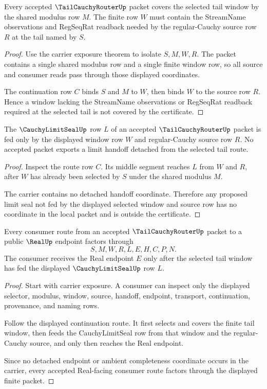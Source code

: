 \begin{theorem}
\label{thm:tailcauchyrouter-modulus-window-coverage}
Every accepted $\TailCauchyRouterUp$ packet covers the selected tail window by the shared modulus row $M$. The finite row $W$ must contain the StreamName observations and RegSeqRat readback needed by the regular-Cauchy source row $R$ at the tail named by $S$.
\end{theorem}
\begin{proof}
Use the carrier exposure theorem to isolate $S,M,W,R$. The packet contains a single shared modulus row and a single finite window row, so all source and consumer reads pass through those displayed coordinates.

The continuation row $C$ binds $S$ and $M$ to $W$, then binds $W$ to the source row $R$. Hence a window lacking the StreamName observations or RegSeqRat readback required at the selected tail is not covered by the certificate.
\end{proof}

\begin{theorem}
\label{thm:tailcauchyrouter-seal-non-escape}
The $\CauchyLimitSealUp$ row $L$ of an accepted $\TailCauchyRouterUp$ packet is fed only by the displayed window row $W$ and regular-Cauchy source row $R$. No accepted packet exports a limit handoff detached from the selected tail route.
\end{theorem}
\begin{proof}
Inspect the route row $C$. Its middle segment reaches $L$ from $W$ and $R$, after $W$ has already been selected by $S$ under the shared modulus $M$.

The carrier contains no detached handoff coordinate. Therefore any proposed limit seal not fed by the displayed selected window and source row has no coordinate in the local packet and is outside the certificate.
\end{proof}

\begin{theorem}
\label{thm:tailcauchyrouter-realup-consumer-handoff}
Every consumer route from an accepted $\TailCauchyRouterUp$ packet to a public $\RealUp$ endpoint factors through
$$
S,M,W,R,L,E,H,C,P,N.
$$
The consumer receives the Real endpoint $E$ only after the selected tail window has fed the displayed $\CauchyLimitSealUp$ row $L$.
\end{theorem}
\begin{proof}
Start with carrier exposure. A consumer can inspect only the displayed selector, modulus, window, source, handoff, endpoint, transport, continuation, provenance, and naming rows.

Follow the displayed continuation route. It first selects and covers the finite tail window, then feeds the CauchyLimitSeal row from that window and the regular-Cauchy source, and only then reaches the Real endpoint.

Since no detached endpoint or ambient completeness coordinate occurs in the carrier, every accepted Real-facing consumer route factors through the displayed finite packet.
\end{proof}

